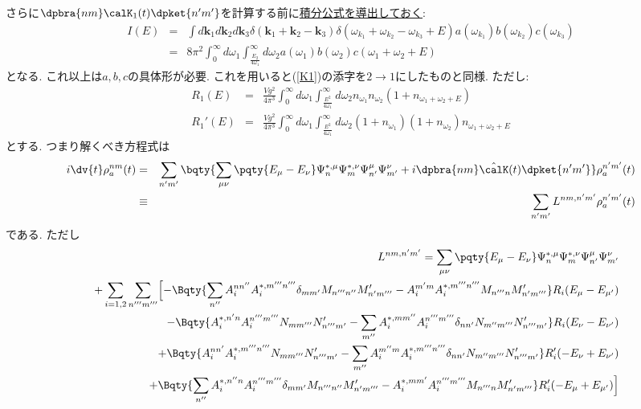 \documentclass[10.5pt,a4paper]{jreport}
\begin{document}
さらに$\dpbra{nm}\calK_1(t)\dpket{n'm'}$を計算する前に\underline{積分公式を導出しておく}:
\begin{eqnarray}
  I(E) &=& \int d\bm{k}_1d\bm{k}_2d\bm{k}_3\delta(\bm{k}_1+\bm{k}_2-\bm{k}_3)\delta(\omega_{k_1} + \omega_{k_2} - \omega_{k_3} + E)a(\omega_{k_1})b(\omega_{k_2})c(\omega_{k_3})\\
  &=& 8\pi^2\int_0^\infty d\omega_1\int_{\frac{E_2}{4\omega_1}}^\infty d\omega_2 a(\omega_1)b(\omega_2)c(\omega_1 + \omega_2 + E)
\end{eqnarray}
となる. これ以上は$a, b, c$の具体形が必要. これを用いると(\ref{K1})の添字を$2\rightarrow1$にしたものと同様. ただし:
\begin{eqnarray}
  R_1(E) &=& \frac{Vg^2}{4\pi^3}\int_0^\infty d\omega_1\int_{\frac{E^2}{4\omega_1}}^\infty d\omega_2 n_{\omega_1}n_{\omega_2}(1 + n_{\omega_1 + \omega_2 + E})\\
  R_1'(E) &=& \frac{Vg^2}{4\pi^3}\int_0^\infty d\omega_1\int_{\frac{E^2}{4\omega_1}}^\infty d\omega_2 (1 + n_{\omega_1})(1 + n_{\omega_2})n_{\omega_1 + \omega_2 + E}
\end{eqnarray}
とする. つまり解くべき方程式は
\begin{eqnarray}
  i\dv{t}\rho_a^{nm}(t) &=& \sum_{n'm'}\bqty{\sum_{\mu\nu}\pqty{E_\mu - E_\nu}\Psi_{n}^{*, \mu}\Psi_{m}^{*, \nu}\Psi_{n'}^{\mu}\Psi_{m'}^{\nu} + i\dpbra{nm}\hat{\calK}(t)\dpket{n'm'}}\rho_a^{n'm'}(t)\\
  &\equiv& \sum_{n'm'} L^{nm, n'm'}\rho_a^{n'm'}(t)\label{Master2}
\end{eqnarray}
である. ただし
\begin{eqnarray}
  &&L^{nm, n'm'} = \sum_{\mu\nu}\pqty{E_\mu - E_\nu}\Psi_{n}^{*, \mu}\Psi_{m}^{*, \nu}\Psi_{n'}^{\mu}\Psi_{m'}^{\nu} \\
  &&+\sum_{i = 1, 2}\sum_{n'''m'''}\Bigl[\nonumber -\Bqty{\sum_{n''}A_i^{nn''}A_i^{*, m'''n'''}\delta_{mm'}M_{n'''n''}M_{n'm'''}' - A_i^{m'm}A_i^{*, m'''n'''}M_{n'''n}M_{n'm'''}'}R_i(E_\mu - E_{\mu'})\\
    \nonumber &&- \Bqty{A_i^{*, n'n}A_i^{n'''m'''}N_{mm'''}N_{n'''m'}' - \sum_{m''}A_i^{*, mm''}A_i^{n'''m'''}\delta_{nn'}N_{m''m'''}N_{n'''m'}'}R_i(E_\nu - E_{\nu'})\\
    \nonumber &&+ \Bqty{A_i^{nn'}A_i^{*, m'''n'''}N_{mm'''}N_{n'''m'}' - \sum_{m''}A_i^{m''m}A_i^{*, m'''n'''}\delta_{nn'}N_{m''m'''}N_{n'''m'}'}R_i'(-E_\nu + E_{\nu'})\\
    \nonumber&&+\Bqty{\sum_{n''}A_i^{*, n''n}A_i^{n'''m'''}\delta_{mm'}M_{n'''n''}M_{n'm'''}' - A_i^{*, mm'}A_i^{n'''m'''}M_{n'''n}M_{n'm'''}'}R_i'(- E_\mu + E_{\mu'})\Bigr]\\\label{L}
\end{eqnarray}
\end{document}
